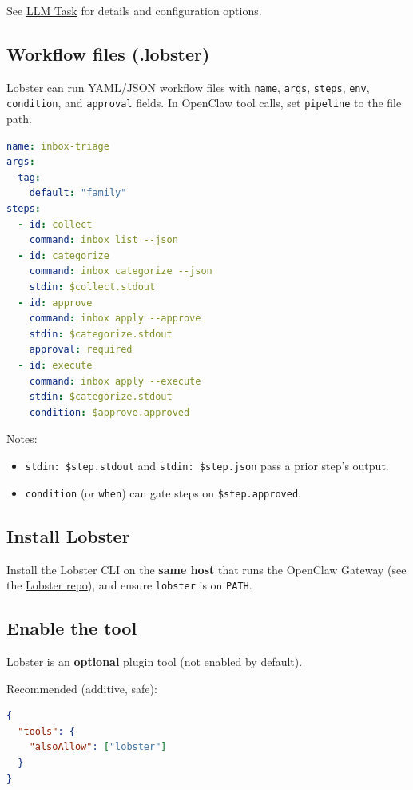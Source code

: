 See \href{/tools/llm-task}{LLM Task} for details and configuration options.

\subsection{Workflow files (.lobster)}


Lobster can run YAML/JSON workflow files with \texttt{name}, \texttt{args}, \texttt{steps}, \texttt{env}, \texttt{condition}, and \texttt{approval} fields. In OpenClaw tool calls, set \texttt{pipeline} to the file path.

\begin{lstlisting}[language=yaml]
name: inbox-triage
args:
  tag:
    default: "family"
steps:
  - id: collect
    command: inbox list --json
  - id: categorize
    command: inbox categorize --json
    stdin: $collect.stdout
  - id: approve
    command: inbox apply --approve
    stdin: $categorize.stdout
    approval: required
  - id: execute
    command: inbox apply --execute
    stdin: $categorize.stdout
    condition: $approve.approved
\end{lstlisting}


Notes:

\begin{itemize}
  \item \texttt{stdin: \$step.stdout} and \texttt{stdin: \$step.json} pass a prior step’s output.
  \item \texttt{condition} (or \texttt{when}) can gate steps on \texttt{\$step.approved}.
\end{itemize}


\subsection{Install Lobster}


Install the Lobster CLI on the \textbf{same host} that runs the OpenClaw Gateway (see the \href{https://github.com/openclaw/lobster}{Lobster repo}), and ensure \texttt{lobster} is on \texttt{PATH}.

\subsection{Enable the tool}


Lobster is an \textbf{optional} plugin tool (not enabled by default).

Recommended (additive, safe):

\begin{lstlisting}[language=json]
{
  "tools": {
    "alsoAllow": ["lobster"]
  }
}
\end{lstlisting}


